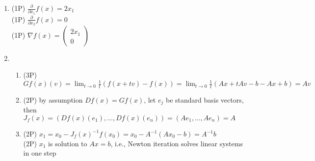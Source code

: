 {\color{solution}
\begin{enumerate}
\item \textcolor{exampoints}{(1P)}  $\frac{\partial}{\partial x_1} f(x) = 2x_1$\\
\textcolor{exampoints}{(1P)}  $\frac{\partial}{\partial x_2} f(x) = 0$\\
\textcolor{exampoints}{(1P)}  $\nabla f(x) = \begin{pmatrix}
 2x_1\\0
\end{pmatrix}$ 
\item
\begin{enumerate}
	 	\item \textcolor{exampoints}{(3P)} $Gf(x)(v)=\lim_{t\to 0}\frac{1}{t}(f(x+tv)-f(x))= \lim_{t\to 0}\frac{1}{t}(Ax + tAv - b-Ax+b) = Av$
	\item \textcolor{exampoints}{(2P)} by assumption $Df(x)=Gf(x)$, let $e_j$ be standard basis vectors, then\\ $J_f(x) = (Df(x)(e_1),\ldots,Df(x)(e_n) )= (Ae_1 ,\ldots,Ae_n  ) = A$
	\item \textcolor{exampoints}{(2P)} $x_1 = x_0 - J_f(x)^{-1}f(x_0)  = x_0 - A^{-1} (Ax_0-b)=A^{-1}b$\\
	\textcolor{exampoints}{(2P)} $x_1$ is solution to $Ax=b$, i.e., Newton iteration solves linear systems in one step
\end{enumerate}
\end{enumerate}
}
